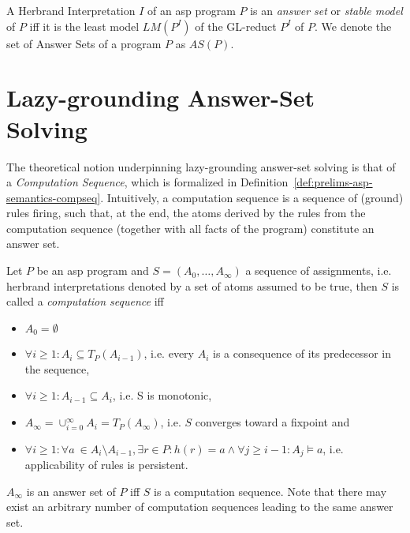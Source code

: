 \begin{definition}
\label{def:prelims-asp-semantics-answer-set}
A Herbrand Interpretation $I$ of an \gls{asp} program $P$ is an \emph{answer set} or \emph{stable model} of $P$ iff it is the least model $LM(P^I)$ of the GL-reduct $P^I$ of $P$. We denote the set of Answer Sets of a program $P$ as $\mathit{AS}(P)$.
\end{definition}

\section{Lazy-grounding Answer-Set Solving}

The theoretical notion underpinning lazy-grounding answer-set solving is that of a \emph{Computation Sequence}, which is formalized in Definition~\ref{def:prelims-asp-semantics-compseq}. Intuitively, a computation sequence is a sequence of (ground) rules firing, such that, at the end, the atoms derived by the rules from the computation sequence (together with all facts of the program) constitute an answer set.

\begin{definition}
\label{def:prelims-asp-semantics-compseq}
Let $P$ be an \gls{asp} program and $S = (A_0,\ldots,A_{\infty})$ a sequence of assignments, i.e. herbrand interpretations denoted by a set of atoms assumed to be true, then $S$ is called a \emph{computation sequence} iff
\begin{itemize}
	\item $A_0 = \emptyset$
	\item $\forall i \geq 1: A_i \subseteq T_P(A_{i - 1})$, i.e. every $A_i$ is a consequence of its predecessor in the sequence,
	\item $\forall i \geq 1: A_{i - 1} \subseteq A_{i}$, i.e. S is monotonic,
	\item $A_{\infty} = \cup^{\infty}_{i = 0} A_i = T_P(A_{\infty})$, i.e. $S$ converges toward a fixpoint and
	\item $\forall i \geq 1: \forall a \ \in A_i \setminus A_{i - 1}, \exists r \in P: h(r) = a \land \forall j \geq i - 1: A_j \models a$, i.e. applicability of rules is persistent.
\end{itemize}
$A_{\infty}$ is an answer set of $P$ iff $S$ is a computation sequence. Note that there may exist an arbitrary number of computation sequences leading to the same answer set.
\end{definition}

